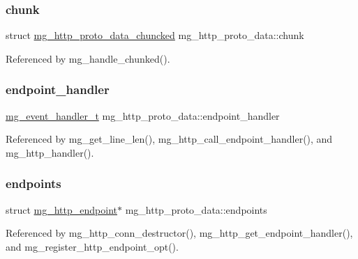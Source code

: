 \subsubsection{\texorpdfstring{chunk}{chunk}}
{\footnotesize\ttfamily struct \hyperlink{structmg__http__proto__data__chuncked}{mg\+\_\+http\+\_\+proto\+\_\+data\+\_\+chuncked} mg\+\_\+http\+\_\+proto\+\_\+data\+::chunk}



Referenced by mg\+\_\+handle\+\_\+chunked().

\mbox{\label{structmg__http__proto__data_ad117a16e518b9752e3f2b9ab6dacc0e3_ad117a16e518b9752e3f2b9ab6dacc0e3}} 
\subsubsection{\texorpdfstring{endpoint\+\_\+handler}{endpoint\_handler}}
{\footnotesize\ttfamily \hyperlink{mongoose_8h_ae5a76da37b3496fcdf561e51648eabda_ae5a76da37b3496fcdf561e51648eabda}{mg\+\_\+event\+\_\+handler\+\_\+t} mg\+\_\+http\+\_\+proto\+\_\+data\+::endpoint\+\_\+handler}



Referenced by mg\+\_\+get\+\_\+line\+\_\+len(), mg\+\_\+http\+\_\+call\+\_\+endpoint\+\_\+handler(), and mg\+\_\+http\+\_\+handler().

\mbox{\label{structmg__http__proto__data_a4c2bc1b9870ba96c459f4b5db1d3d5ed_a4c2bc1b9870ba96c459f4b5db1d3d5ed}} 
\subsubsection{\texorpdfstring{endpoints}{endpoints}}
{\footnotesize\ttfamily struct \hyperlink{structmg__http__endpoint}{mg\+\_\+http\+\_\+endpoint}$\ast$ mg\+\_\+http\+\_\+proto\+\_\+data\+::endpoints}



Referenced by mg\+\_\+http\+\_\+conn\+\_\+destructor(), mg\+\_\+http\+\_\+get\+\_\+endpoint\+\_\+handler(), and mg\+\_\+register\+\_\+http\+\_\+endpoint\+\_\+opt().

